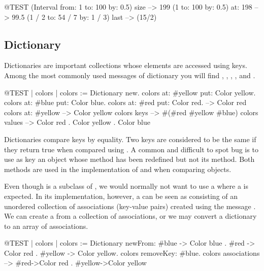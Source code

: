 \documentclass[a4paper,10pt,twoside]{book}
\begin{document}
\begin{code}{@TEST}
(Interval from: 1 to: 100 by: 0.5) size --> 199
(1 to: 100 by: 0.5) at: 198 --> 99.5
(1 / 2 to: 54 / 7 by: 1 / 3) last --> (15/2)
\end{code}

\subsection{Dictionary}
Dictionaries are important collections whose elements are accessed using keys.
Among the most commonly used messages of dictionary you will find , , , , and .

\begin{code}{@TEST | colors |}
colors := Dictionary new.
colors at: #yellow put: Color yellow.
colors at: #blue put: Color blue.
colors at: #red put: Color red. --> Color red
colors at: #yellow --> Color yellow
colors keys          --> #(#red #yellow #blue)
colors values       -->  {Color red . Color yellow . Color blue}
\end{code}

Dictionaries compare keys by equality.
Two keys are considered to be the same if they return true when compared using \ct{=}.
A common and difficult to spot bug is to use as key an object whose \ct{=} method has been redefined but not its  method.
Both methods are used in the implementation of  and when comparing objects.

Even though  is a subclass of , we would normally not want to use a  where a  is expected.
In its implementation, however, a  can be seen as consisting of an unordered collection of associations (key-value pairs) created using the message .
We can create a  from a collection of associations, or we may convert a dictionary to an array of associations.

\begin{code}{@TEST | colors |}
colors := Dictionary newFrom: {#blue -> Color blue . #red -> Color red . #yellow -> Color yellow}.
colors removeKey: #blue.
colors associations --> {#red->Color red . #yellow->Color yellow}
\end{code}
\end{document}
